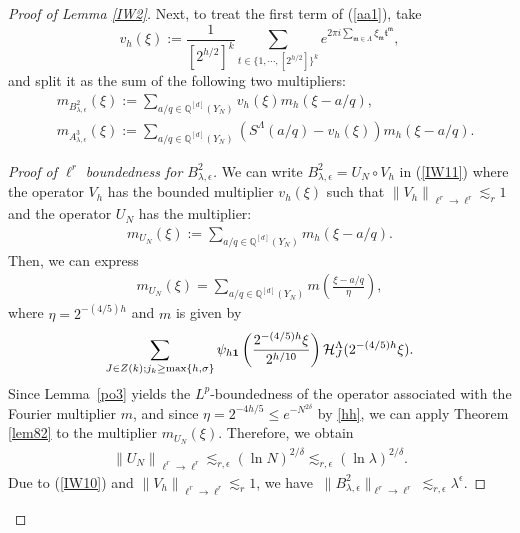 \documentclass[10pt,a4paper]{amsart}
\numberwithin{equation}{section}
\begin{document}
\begin{proof}[Proof of Lemma \ref{IW2}]
	
	
	Next, to treat the first term of (\ref{aa1}), take
	$$v_{h}(\xi):=\frac{1}{[2^{h/2}]^k} \sum_{t\in \{1,\cdots,[2^{h/2}]\}^k} e^{2 \pi i \sum_{\mathfrak{m}\in\Lambda} \xi_{\mathfrak{m}} \mathfrak{t}^{\mathfrak{m}}},$$ and split it as the sum of the following two  multipliers:
	\begin{align}
		&m_{B_{\lambda, \epsilon}^{2} }(\xi):=\sum_{a/q \in \mathbb{Q}^{[d]}(Y_N)}  v_{h}(\xi)m_{h} (\xi -a/q), \label{IW11}
		\\
		&m_{A_{\lambda, \epsilon}^{3} }(\xi):=\sum_{a/q \in \mathbb{Q}^{[d]}(Y_N)}( S^{\Lambda}(a / q) -v_h(\xi))m_{h}(\xi-a/q).\label{pol2}
	\end{align}
	\begin{proof}[Proof of $\ell^r$ boundedness for $B_{\lambda, \epsilon}^{2}$]
		We can write   $B_{\lambda, \epsilon}^{2}=U_{N} \circ V_{h}$ in (\ref{IW11}) where the operator $V_h$ has the bounded multiplier $v_h(\xi)$  such that $\left\|V_{h}\right\|_{\ell^{r} \rightarrow \ell^{r}} \lesssim_{r} 1$ and
		the operator $U_{N}$ has  the multiplier:
		\begin{align*}
			m_{U_N}(\xi):=\sum_{a/q \in \mathbb{Q}^{[d]}(Y_N)}m_{h}  (\xi-a/q).
		\end{align*}
		Then, we can express
		\begin{align*}
			m_{U_N}(\xi)= \sum_{a/q \in \mathbb{Q}^{[d]}(Y_N)} m \left(\frac{\xi-a/q}{\eta}\right),
		\end{align*}
		where  $\eta=2^{-(4/5)h}$ and $m$ is given by
		\begin{align*}
			\sum_{J\in Z(k); j_k\ge \max\{h,\sigma\}} \psi_{h{\bf 1}}\left(\frac{2^{-(4/5)h}\xi}{2^{h/10}}\right)\mathcal{H}^{\Lambda}_{J}(2^{-(4/5)h}\xi ).
		\end{align*}
Since Lemma~\ref{po3} yields the $L^p$-boundedness of the operator associated with the Fourier multiplier $m$, and since $\eta=2^{-4h/5}\leq e^{-N^{2\delta}}$ by \eqref{hh},  we can apply Theorem \ref{lem82} to the multiplier $m_{U_N}(\xi)$. Therefore, we  obtain
		\begin{align}\label{IW10}
			\left\|U_{N}\right\|_{\ell^{r} \rightarrow \ell^{r}}\lesssim_{r,\epsilon} (\ln  N)^{2/\delta}\lesssim_{r,\epsilon}(\ln \lambda)^{2 / \delta} .
		\end{align}
		Due to (\ref{IW10}) and $\left\|V_{h}\right\|_{\ell^{r} \rightarrow \ell^{r}} \lesssim_{r} 1$, we have
		$ 
		\ \|B_{\lambda, \epsilon}^{2} \|_{\ell^{r} \rightarrow \ell^{r}} \lesssim_{r,\epsilon}  \lambda^{\epsilon}.
		$ 
	\end{proof}
	

\end{proof}
\end{document}
